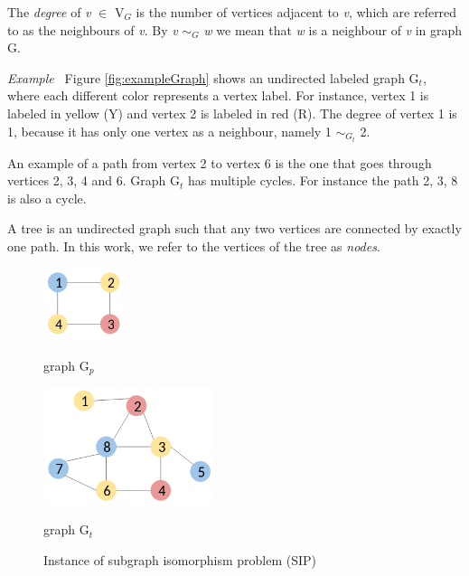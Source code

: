 \documentclass{l4proj}
\newcounter{example}[section]
\newenvironment{example}[1][]{\refstepcounter{example}\par\medskip
   \noindent \textit{Example~\theexample #1} \rmfamily}{\medskip}
\begin{document}
The \emph{degree} of \emph{v} $\in$ V$_{G}$ is the number of vertices adjacent to \emph{v}, which are referred to as the neighbours of \emph{v}. By \emph{v} $\sim_{G}$ \textit{w} we mean that \textit{w} is a neighbour of \emph{v} in graph G.
 
\begin{example}
Figure \ref{fig:exampleGraph} shows an undirected labeled graph G$_{t}$, where each different color represents a vertex label. For instance, vertex 1 is labeled in yellow (Y) and vertex 2 is labeled in red (R). The degree of vertex 1 is 1, because it has only one vertex as a neighbour, namely 1 $\sim_{G_{t}}$ 2. 

An example of a path from vertex 2 to vertex 6 is the one that goes through vertices 2, 3, 4 and 6. Graph G$_{t}$ has multiple cycles. For instance the path 2, 3, 8 is also a cycle.
\end{example}

A tree is an undirected graph such that any two vertices are connected by exactly one path. In this work, we refer to the vertices of the tree as \emph{nodes}.

\begin{figure}[H]
\centering
\begin{minipage}[t]{.4\textwidth}
  \centering
  \includegraphics[height=2.1cm,width=2.3cm]{images/graphs/exampleGraph2.png}
  \caption{graph G$_{p}$}
  \label{fig:exampleGraph2}
\end{minipage}%
\begin{minipage}[t]{.6\textwidth}
  \centering
  \includegraphics[height=3.4cm,width=5cm]{images/graphs/exampleGraph.png}
  \caption{graph G$_{t}$}
  \label{fig:exampleGraph}
\end{minipage}%
\caption{Instance of subgraph isomorphism problem (SIP)}
\label{fig:SIP}
\end{figure}

\end{document}
